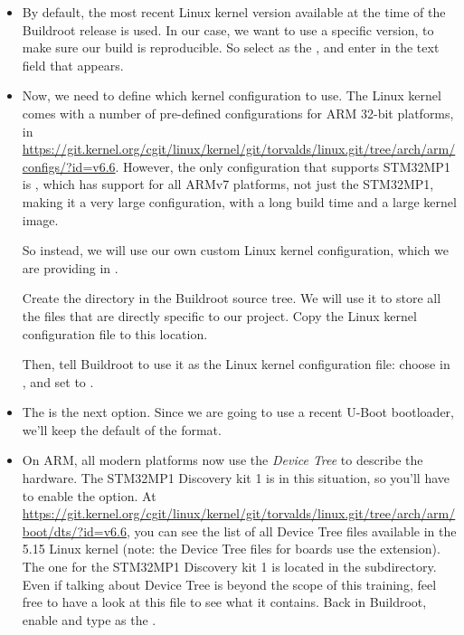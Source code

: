 \begin{itemize}
\begin{itemize}
  \item By default, the most recent Linux kernel version available at
    the time of the Buildroot release is used. In our case, we want to
    use a specific version, to make sure our build is reproducible. So
    select  as the , and
    enter  in the  text field that
    appears.

  \item Now, we need to define which kernel configuration to use. The
    Linux kernel comes with a number of pre-defined configurations for
    ARM 32-bit platforms, in
    \url{https://git.kernel.org/cgit/linux/kernel/git/torvalds/linux.git/tree/arch/arm/configs/?id=v6.6}. However,
    the only configuration that supports STM32MP1 is
    , which has support for all ARMv7
    platforms, not just the STM32MP1, making it a very large
    configuration, with a long build time and a large kernel image.

    So instead, we will use our own custom Linux kernel configuration,
    which we are providing in
    .

    Create the directory  in the Buildroot
    source tree. We will use it to store all the files that are
    directly specific to our project. Copy the Linux kernel
    configuration file to this location.

    Then, tell Buildroot to use it as the Linux kernel configuration
    file: choose  in , and set  to
    .

  \item The  is the next option. Since we
    are going to use a recent U-Boot bootloader, we'll keep the
    default of the  format.

  \item On ARM, all modern platforms now use the {\em Device Tree} to
    describe the hardware. The STM32MP1 Discovery kit 1 is in this
    situation, so you'll have to enable the 
    option. At \url{https://git.kernel.org/cgit/linux/kernel/git/torvalds/linux.git/tree/arch/arm/boot/dts/?id=v6.6},
    you can see the list of all Device Tree files available in the
    5.15 Linux kernel (note: the Device Tree files for boards use
    the  extension). The one for the STM32MP1 Discovery kit
    1 is  located in the 
    subdirectory. Even if talking about Device Tree is beyond the
    scope of this training, feel free to have a look at this file to
    see what it contains. Back in Buildroot, enable  and type  as
    the .


\end{itemize}
\end{itemize}
